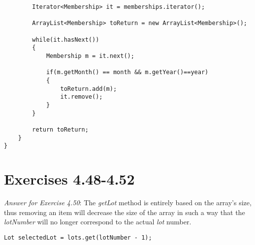\documentclass[10pt,a4paper]{article}
\begin{document}
\begin{lstlisting}
        Iterator<Membership> it = memberships.iterator();
        
        ArrayList<Membership> toReturn = new ArrayList<Membership>();
            
        while(it.hasNext())
        {
            Membership m = it.next();
            
            if(m.getMonth() == month && m.getYear()==year)
            {
                toReturn.add(m);
                it.remove();
            }
        }
        
        return toReturn;
    }
}
\end{lstlisting}

\section*{Exercises 4.48-4.52}
\textit{Answer for Exercise 4.50}: The \textit{getLot} method is entirely based on the array's size, thus removing an item will decrease the size of the array in such a way that the \textit{lotNumber} will no longer correspond to the actual \textit{lot} number.

\verb|Lot selectedLot = lots.get(lotNumber - 1);|
\end{document}
